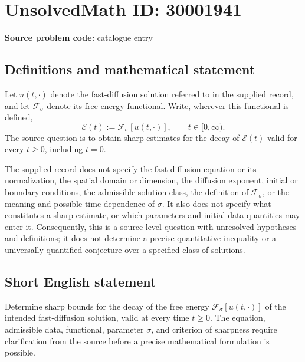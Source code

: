 \documentclass[11pt]{article}
\begin{document}
\section*{UnsolvedMath ID: 30001941}
\textbf{Source problem code:} catalogue entry
\subsection{Definitions and mathematical statement}
Let \(u(t,\cdot)\) denote the fast-diffusion solution referred to in the supplied record, and let \(\mathcal F_\sigma\) denote its free-energy functional. Write, wherever this functional is defined,
\[
\mathcal E(t):=\mathcal F_\sigma[u(t,\cdot)],\qquad t\in[0,\infty).
\]
The source question is to obtain sharp estimates for the decay of \(\mathcal E(t)\) valid for every \(t\geq0\), including \(t=0\).

The supplied record does not specify the fast-diffusion equation or its normalization, the spatial domain or dimension, the diffusion exponent, initial or boundary conditions, the admissible solution class, the definition of \(\mathcal F_\sigma\), or the meaning and possible time dependence of \(\sigma\). It also does not specify what constitutes a sharp estimate, or which parameters and initial-data quantities may enter it. Consequently, this is a source-level question with unresolved hypotheses and definitions; it does not determine a precise quantitative inequality or a universally quantified conjecture over a specified class of solutions.
\subsection{Short English statement}
Determine sharp bounds for the decay of the free energy \(\mathcal F_\sigma[u(t,\cdot)]\) of the intended fast-diffusion solution, valid at every time \(t\geq0\). The equation, admissible data, functional, parameter \(\sigma\), and criterion of sharpness require clarification from the source before a precise mathematical formulation is possible.
\end{document}
